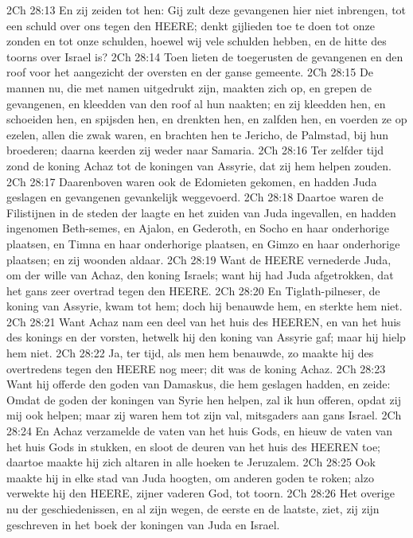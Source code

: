 2Ch 28:13  En zij zeiden tot hen: Gij zult deze gevangenen hier niet inbrengen, tot een schuld over ons tegen den HEERE; denkt gijlieden toe te doen tot onze zonden en tot onze schulden, hoewel wij vele schulden hebben, en de hitte des toorns over Israel is?
2Ch 28:14  Toen lieten de toegerusten de gevangenen en den roof voor het aangezicht der oversten en der ganse gemeente.
2Ch 28:15  De mannen nu, die met namen uitgedrukt zijn, maakten zich op, en grepen de gevangenen, en kleedden van den roof al hun naakten; en zij kleedden hen, en schoeiden hen, en spijsden hen, en drenkten hen, en zalfden hen, en voerden ze op ezelen, allen die zwak waren, en brachten hen te Jericho, de Palmstad, bij hun broederen; daarna keerden zij weder naar Samaria.
2Ch 28:16  Ter zelfder tijd zond de koning Achaz tot de koningen van Assyrie, dat zij hem helpen zouden.
2Ch 28:17  Daarenboven waren ook de Edomieten gekomen, en hadden Juda geslagen en gevangenen gevankelijk weggevoerd.
2Ch 28:18  Daartoe waren de Filistijnen in de steden der laagte en het zuiden van Juda ingevallen, en hadden ingenomen Beth-semes, en Ajalon, en Gederoth, en Socho en haar onderhorige plaatsen, en Timna en haar onderhorige plaatsen, en Gimzo en haar onderhorige plaatsen; en zij woonden aldaar.
2Ch 28:19  Want de HEERE vernederde Juda, om der wille van Achaz, den koning Israels; want hij had Juda afgetrokken, dat het gans zeer overtrad tegen den HEERE.
2Ch 28:20  En Tiglath-pilneser, de koning van Assyrie, kwam tot hem; doch hij benauwde hem, en sterkte hem niet.
2Ch 28:21  Want Achaz nam een deel van het huis des HEEREN, en van het huis des konings en der vorsten, hetwelk hij den koning van Assyrie gaf; maar hij hielp hem niet.
2Ch 28:22  Ja, ter tijd, als men hem benauwde, zo maakte hij des overtredens tegen den HEERE nog meer; dit was de koning Achaz.
2Ch 28:23  Want hij offerde den goden van Damaskus, die hem geslagen hadden, en zeide: Omdat de goden der koningen van Syrie hen helpen, zal ik hun offeren, opdat zij mij ook helpen; maar zij waren hem tot zijn val, mitsgaders aan gans Israel.
2Ch 28:24  En Achaz verzamelde de vaten van het huis Gods, en hieuw de vaten van het huis Gods in stukken, en sloot de deuren van het huis des HEEREN toe; daartoe maakte hij zich altaren in alle hoeken te Jeruzalem.
2Ch 28:25  Ook maakte hij in elke stad van Juda hoogten, om anderen goden te roken; alzo verwekte hij den HEERE, zijner vaderen God, tot toorn.
2Ch 28:26  Het overige nu der geschiedenissen, en al zijn wegen, de eerste en de laatste, ziet, zij zijn geschreven in het boek der koningen van Juda en Israel.
